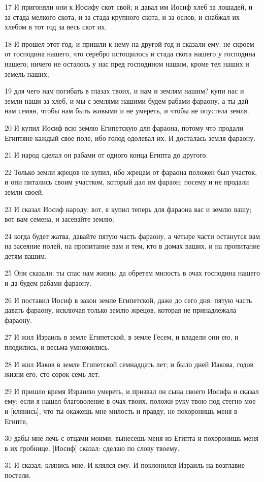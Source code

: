\par 17 И пригоняли они к Иосифу скот свой; и давал им Иосиф хлеб за лошадей, и за стада мелкого скота, и за стада крупного скота, и за ослов; и снабжал их хлебом в тот год за весь скот их.
\par 18 И прошел этот год; и пришли к нему на другой год и сказали ему: не скроем от господина нашего, что серебро истощилось и стада скота нашего у господина нашего; ничего не осталось у нас пред господином нашим, кроме тел наших и земель наших;
\par 19 для чего нам погибать в глазах твоих, и нам и землям нашим? купи нас и земли наши за хлеб, и мы с землями нашими будем рабами фараону, а ты дай нам семян, чтобы нам быть живыми и не умереть, и чтобы не опустела земля.
\par 20 И купил Иосиф всю землю Египетскую для фараона, потому что продали Египтяне каждый свое поле, ибо голод одолевал их. И досталась земля фараону.
\par 21 И народ сделал он рабами от одного конца Египта до другого.
\par 22 Только земли жрецов не купил, ибо жрецам от фараона положен был участок, и они питались своим участком, который дал им фараон; посему и не продали земли своей.
\par 23 И сказал Иосиф народу: вот, я купил теперь для фараона вас и землю вашу; вот вам семена, и засевайте землю;
\par 24 когда будет жатва, давайте пятую часть фараону, а четыре части останутся вам на засеяние полей, на пропитание вам и тем, кто в домах ваших, и на пропитание детям вашим.
\par 25 Они сказали: ты спас нам жизнь; да обретем милость в очах господина нашего и да будем рабами фараону.
\par 26 И поставил Иосиф в закон земле Египетской, даже до сего дня: пятую часть давать фараону, исключая только землю жрецов, которая не принадлежала фараону.
\par 27 И жил Израиль в земле Египетской, в земле Гесем, и владели они ею, и плодились, и весьма умножились.
\par 28 И жил Иаков в земле Египетской семнадцать лет; и было дней Иакова, годов жизни его, сто сорок семь лет.
\par 29 И пришло время Израилю умереть, и призвал он сына своего Иосифа и сказал ему: если я нашел благоволение в очах твоих, положи руку твою под стегно мое и [клянись], что ты окажешь мне милость и правду, не похоронишь меня в Египте,
\par 30 дабы мне лечь с отцами моими; вынесешь меня из Египта и похоронишь меня в их гробнице. [Иосиф] сказал: сделаю по слову твоему.
\par 31 И сказал: клянись мне. И клялся ему. И поклонился Израиль на возглавие постели.

